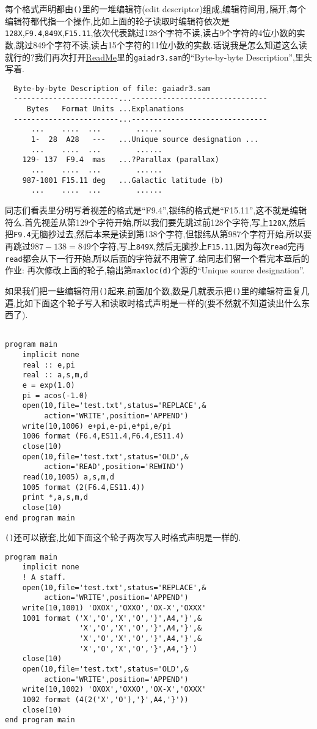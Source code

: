 每个格式声明都由\texttt{()}里的一堆编辑符(edit descriptor)组成,编辑符间用\texttt{,}隔开,每个编辑符都代指一个操作,比如上面的轮子读取时编辑符依次是\texttt{128X},\texttt{F9.4},\texttt{849X},\texttt{F15.11},依次代表跳过128个字符不读,读占9个字符的4位小数的实数,跳过849个字符不读,读占15个字符的11位小数的实数.话说我是怎么知道这么读就行的?我们再次打开\href{https://cdsarc.cds.unistra.fr/viz-bin/ReadMe/I/355?format=html&tex=true}{ReadMe}里的\texttt{gaiadr3.sam}的``Byte-by-byte Description'',里头写着.
\begin{lstlisting}
  Byte-by-byte Description of file: gaiadr3.sam
  ------------------------...-------------------------------
     Bytes   Format Units ...Explanations
  ------------------------...-------------------------------
      ...    ....  ...        ......
      1-  28  A28   ---   ...Unique source designation ...
      ...    ....  ...        ......
    129- 137  F9.4  mas   ...?Parallax (parallax)
      ...    ....  ...        ......
    987-1001 F15.11 deg   ...Galactic latitude (b)
      ...    ....  ...        ......
\end{lstlisting}
同志们看表里分明写着视差的格式是``F9.4'',银纬的格式是``F15.11'',这不就是编辑符么.首先视差从第129个字符开始,所以我们要先跳过前128个字符,写上\texttt{128X},然后把\texttt{F9.4}无脑抄过去,然后本来是读到第138个字符,但银纬从第987个字符开始,所以要再跳过$987-138=849$个字符,写上\texttt{849X},然后无脑抄上\texttt{F15.11},因为每次\texttt{read}完再\texttt{read}都会从下一行开始,所以后面的字符就不用管了.给同志们留一个看完本章后的作业: 再次修改上面的轮子,输出第\texttt{maxloc(d)}个源的``Unique source designation''.

如果我们把一些编辑符用\texttt{()}起来,前面加个数,数是几就表示把\texttt{()}里的编辑符重复几遍,比如下面这个轮子写入和读取时格式声明是一样的(要不然就不知道读出什么东西了).
\begin{lstlisting}

program main
    implicit none
    real :: e,pi
    real :: a,s,m,d
    e = exp(1.0)
    pi = acos(-1.0)
    open(10,file='test.txt',status='REPLACE',&
         action='WRITE',position='APPEND')
    write(10,1006) e+pi,e-pi,e*pi,e/pi
    1006 format (F6.4,ES11.4,F6.4,ES11.4)
    close(10)
    open(10,file='test.txt',status='OLD',&
         action='READ',position='REWIND')
    read(10,1005) a,s,m,d
    1005 format (2(F6.4,ES11.4))
    print *,a,s,m,d
    close(10)
end program main
\end{lstlisting}
\texttt{()}还可以嵌套,比如下面这个轮子两次写入时格式声明是一样的.
\begin{lstlisting}
program main
    implicit none
    ! A staff.
    open(10,file='test.txt',status='REPLACE',&
         action='WRITE',position='APPEND')
    write(10,1001) 'OXOX','OXXO','OX-X','OXXX'
    1001 format ('X','O','X','O','}',A4,'}',&
                 'X','O','X','O','}',A4,'}',&
                 'X','O','X','O','}',A4,'}',&
                 'X','O','X','O','}',A4,'}')
    close(10)
    open(10,file='test.txt',status='OLD',&
         action='WRITE',position='APPEND')
    write(10,1002) 'OXOX','OXXO','OX-X','OXXX'
    1002 format (4(2('X','O'),'}',A4,'}'))
    close(10)
end program main
\end{lstlisting}


